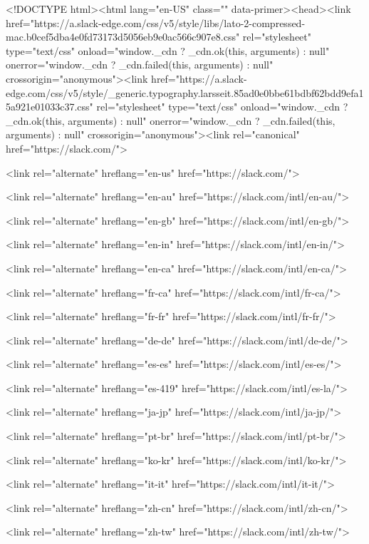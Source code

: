 <!DOCTYPE html><html lang="en-US" class="" data-primer><head><link href="https://a.slack-edge.com/css/v5/style/libs/lato-2-compressed-mac.b0cef5dba4e0fd73173d5056eb9e0ac566c907e8.css" rel="stylesheet" type="text/css" onload="window._cdn ? _cdn.ok(this, arguments) : null" onerror="window._cdn ? _cdn.failed(this, arguments) : null" crossorigin="anonymous"><link href="https://a.slack-edge.com/css/v5/style/_generic.typography.larsseit.85ad0e0bbe61bdbf62bdd9efa15a921e01033c37.css" rel="stylesheet" type="text/css" onload="window._cdn ? _cdn.ok(this, arguments) : null" onerror="window._cdn ? _cdn.failed(this, arguments) : null" crossorigin="anonymous"><link rel="canonical" href="https://slack.com/">

<link rel="alternate" hreflang="en-us" href="https://slack.com/">

<link rel="alternate" hreflang="en-au" href="https://slack.com/intl/en-au/">

<link rel="alternate" hreflang="en-gb" href="https://slack.com/intl/en-gb/">

<link rel="alternate" hreflang="en-in" href="https://slack.com/intl/en-in/">

<link rel="alternate" hreflang="en-ca" href="https://slack.com/intl/en-ca/">

<link rel="alternate" hreflang="fr-ca" href="https://slack.com/intl/fr-ca/">

<link rel="alternate" hreflang="fr-fr" href="https://slack.com/intl/fr-fr/">

<link rel="alternate" hreflang="de-de" href="https://slack.com/intl/de-de/">

<link rel="alternate" hreflang="es-es" href="https://slack.com/intl/es-es/">

<link rel="alternate" hreflang="es-419" href="https://slack.com/intl/es-la/">

<link rel="alternate" hreflang="ja-jp" href="https://slack.com/intl/ja-jp/">

<link rel="alternate" hreflang="pt-br" href="https://slack.com/intl/pt-br/">

<link rel="alternate" hreflang="ko-kr" href="https://slack.com/intl/ko-kr/">

<link rel="alternate" hreflang="it-it" href="https://slack.com/intl/it-it/">

<link rel="alternate" hreflang="zh-cn" href="https://slack.com/intl/zh-cn/">

<link rel="alternate" hreflang="zh-tw" href="https://slack.com/intl/zh-tw/">

